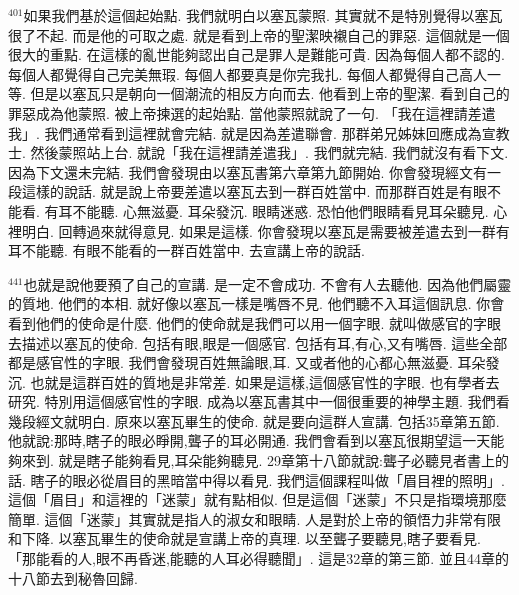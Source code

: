 \documentclass{book}
\begin{document}
$^{401}$如果我們基於這個起始點.
我們就明白以塞瓦蒙照.
其實就不是特別覺得以塞瓦很了不起.
而是他的可取之處.
就是看到上帝的聖潔映襯自己的罪惡.
這個就是一個很大的重點.
在這樣的亂世能夠認出自己是罪人是難能可貴.
因為每個人都不認的.
每個人都覺得自己完美無瑕.
每個人都要真是你完我扎.
每個人都覺得自己高人一等.
但是以塞瓦只是朝向一個潮流的相反方向而去.
他看到上帝的聖潔.
看到自己的罪惡成為他蒙照.
被上帝揀選的起始點.
當他蒙照就說了一句.
「我在這裡請差遣我」.
我們通常看到這裡就會完結.
就是因為差遣聯會.
那群弟兄姊妹回應成為宣教士.
然後蒙照站上台.
就說「我在這裡請差遣我」.
我們就完結.
我們就沒有看下文.
因為下文還未完結.
我們會發現由以塞瓦書第六章第九節開始.
你會發現經文有一段這樣的說話.
就是說上帝要差遣以塞瓦去到一群百姓當中.
而那群百姓是有眼不能看.
有耳不能聽.
心無滋憂.
耳朵發沉.
眼睛迷惑.
恐怕他們眼睛看見耳朵聽見.
心裡明白.
回轉過來就得意見.
如果是這樣.
你會發現以塞瓦是需要被差遣去到一群有耳不能聽.
有眼不能看的一群百姓當中.
去宣講上帝的說話.

$^{441}$也就是說他要預了自己的宣講.
是一定不會成功.
不會有人去聽他.
因為他們屬靈的質地.
他們的本相.
就好像以塞瓦一樣是嘴唇不見.
他們聽不入耳這個訊息.
你會看到他們的使命是什麼.
他們的使命就是我們可以用一個字眼.
就叫做感官的字眼去描述以塞瓦的使命.
包括有眼,眼是一個感官.
包括有耳,有心,又有嘴唇.
這些全部都是感官性的字眼.
我們會發現百姓無論眼,耳.
又或者他的心都心無滋憂.
耳朵發沉.
也就是這群百姓的質地是非常差.
如果是這樣,這個感官性的字眼.
也有學者去研究.
特別用這個感官性的字眼.
成為以塞瓦書其中一個很重要的神學主題.
我們看幾段經文就明白.
原來以塞瓦畢生的使命.
就是要向這群人宣講.
包括35章第五節.
他就說:那時,瞎子的眼必睜開,聾子的耳必開通.
我們會看到以塞瓦很期望這一天能夠來到.
就是瞎子能夠看見,耳朵能夠聽見.
29章第十八節就說:聾子必聽見者書上的話.
瞎子的眼必從眉目的黑暗當中得以看見.
我們這個課程叫做「眉目裡的照明」.
這個「眉目」和這裡的「迷蒙」就有點相似.
但是這個「迷蒙」不只是指環境那麼簡單.
這個「迷蒙」其實就是指人的淑女和眼睛.
人是對於上帝的領悟力非常有限和下降.
以塞瓦畢生的使命就是宣講上帝的真理.
以至聾子要聽見,瞎子要看見.
「那能看的人,眼不再昏迷,能聽的人耳必得聽聞」.
這是32章的第三節.
並且44章的十八節去到秘魯回歸.
\end{document}

